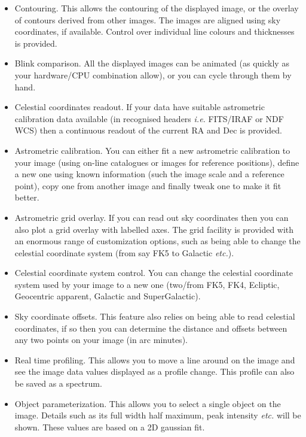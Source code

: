 \documentclass[twoside,11pt]{article}
\renewcommand{\_}{\texttt{\symbol{95}}}
\begin{document}
\begin{itemize}
\item Contouring. This allows the contouring of the displayed image,
 or the overlay of contours derived from other images. The images are
 aligned using sky coordinates, if available. Control over individual
 line colours and thicknesses is provided.

\item Blink comparison. All the displayed images can be animated
  (as quickly as your hardware/CPU combination allow), or
  you can cycle through them by hand.

\item Celestial coordinates readout. If your data have suitable
  astrometric calibration data available (in recognised headers
  {\em i.e.} FITS/IRAF or NDF WCS) then a continuous readout of the
  current RA and Dec is provided.

\item Astrometric calibration. You can either fit a new
  astrometric calibration to your image (using on-line catalogues or
  images for reference positions), define a new one using known
  information (such the image scale and a reference point), copy one
  from another image and finally tweak one to make it fit better.

\item Astrometric grid overlay. If you can read out sky coordinates
  then you can also plot a grid overlay with labelled
  axes. The grid facility is provided with an enormous range of
  customization options, such as being able to change the
  celestial coordinate system (from say FK5 to  Galactic {\em etc.}).

\item Celestial coordinate system control. You can change the celestial
  coordinate system used by your image to a new one (two/from FK5,
  FK4, Ecliptic, Geocentric apparent, Galactic and SuperGalactic).

\item Sky coordinate offsets. This feature also relies on being
  able to read celestial coordinates, if so then you can
  determine the distance and offsets between any two points on
  your image (in arc minutes).

\item Real time profiling. This allows you to move a line around on
  the image and see the image data values displayed as a
  profile change. This profile can also be saved as a spectrum.

\item Object parameterization. This allows you to select a single
  object on the image. Details such as its full width half
  maximum, peak intensity {\em etc.} will be shown. These values are
  based on a 2D gaussian fit.
\end{itemize}
\end{document}

